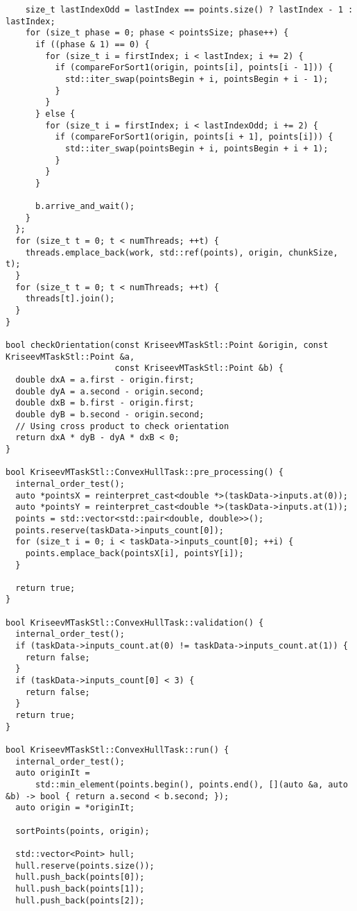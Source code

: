 \documentclass[a4paper]{article}
\begin{document}
\begin{lstlisting}
    size_t lastIndexOdd = lastIndex == points.size() ? lastIndex - 1 : lastIndex;
    for (size_t phase = 0; phase < pointsSize; phase++) {
      if ((phase & 1) == 0) {
        for (size_t i = firstIndex; i < lastIndex; i += 2) {
          if (compareForSort1(origin, points[i], points[i - 1])) {
            std::iter_swap(pointsBegin + i, pointsBegin + i - 1);
          }
        }
      } else {
        for (size_t i = firstIndex; i < lastIndexOdd; i += 2) {
          if (compareForSort1(origin, points[i + 1], points[i])) {
            std::iter_swap(pointsBegin + i, pointsBegin + i + 1);
          }
        }
      }

      b.arrive_and_wait();
    }
  };
  for (size_t t = 0; t < numThreads; ++t) {
    threads.emplace_back(work, std::ref(points), origin, chunkSize, t);
  }
  for (size_t t = 0; t < numThreads; ++t) {
    threads[t].join();
  }
}

bool checkOrientation(const KriseevMTaskStl::Point &origin, const KriseevMTaskStl::Point &a,
                      const KriseevMTaskStl::Point &b) {
  double dxA = a.first - origin.first;
  double dyA = a.second - origin.second;
  double dxB = b.first - origin.first;
  double dyB = b.second - origin.second;
  // Using cross product to check orientation
  return dxA * dyB - dyA * dxB < 0;
}

bool KriseevMTaskStl::ConvexHullTask::pre_processing() {
  internal_order_test();
  auto *pointsX = reinterpret_cast<double *>(taskData->inputs.at(0));
  auto *pointsY = reinterpret_cast<double *>(taskData->inputs.at(1));
  points = std::vector<std::pair<double, double>>();
  points.reserve(taskData->inputs_count[0]);
  for (size_t i = 0; i < taskData->inputs_count[0]; ++i) {
    points.emplace_back(pointsX[i], pointsY[i]);
  }

  return true;
}

bool KriseevMTaskStl::ConvexHullTask::validation() {
  internal_order_test();
  if (taskData->inputs_count.at(0) != taskData->inputs_count.at(1)) {
    return false;
  }
  if (taskData->inputs_count[0] < 3) {
    return false;
  }
  return true;
}

bool KriseevMTaskStl::ConvexHullTask::run() {
  internal_order_test();
  auto originIt =
      std::min_element(points.begin(), points.end(), [](auto &a, auto &b) -> bool { return a.second < b.second; });
  auto origin = *originIt;

  sortPoints(points, origin);

  std::vector<Point> hull;
  hull.reserve(points.size());
  hull.push_back(points[0]);
  hull.push_back(points[1]);
  hull.push_back(points[2]);


\end{lstlisting}
\end{document}
